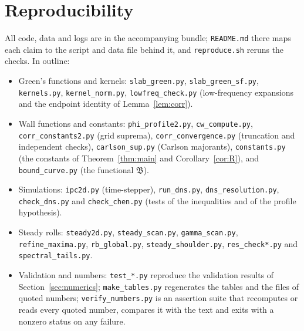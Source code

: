 \section{Reproducibility}\label{app:repro}
All code, data and logs are in the accompanying bundle; \texttt{README.md} there maps each claim to the script
and data file behind it, and \texttt{reproduce.sh} reruns the checks. In outline:
\begin{itemize}\raggedright
\item Green's functions and kernels: \texttt{slab\_green.py}, \texttt{slab\_green\_sf.py}, \texttt{kernels.py},
\texttt{kernel\_norm.py}, \texttt{lowfreq\_check.py} (low-frequency expansions and the endpoint identity of
Lemma~\ref{lem:corr}).
\item Wall functions and constants: \texttt{phi\_profile2.py}, \texttt{cw\_compute.py}, \texttt{corr\_constants2.py}
(grid suprema), \texttt{corr\_convergence.py} (truncation and independent checks), \texttt{carlson\_sup.py}
(Carlson majorants), \texttt{constants.py} (the constants of Theorem~\ref{thm:main} and Corollary~\ref{cor:R}), and
\texttt{bound\_curve.py} (the functional $\mathfrak B$).
\item Simulations: \texttt{ipc2d.py} (time-stepper), \texttt{run\_dns.py}, \texttt{dns\_resolution.py},
\texttt{check\_dns.py} and \texttt{check\_chen.py} (tests of the inequalities and of the profile hypothesis).
\item Steady rolls: \texttt{steady2d.py}, \texttt{steady\_scan.py}, \texttt{gamma\_scan.py},
\texttt{refine\_maxima.py}, \texttt{rb\_global.py}, \texttt{steady\_shoulder.py}, \texttt{res\_check*.py} and
\texttt{spectral\_tails.py}.
\item Validation and numbers: \texttt{test\_*.py} reproduce the validation results of Section~\ref{sec:numerics};
\texttt{make\_tables.py} regenerates the tables and the files of quoted numbers; \texttt{verify\_numbers.py} is an
assertion suite that recomputes or reads every quoted number, compares it with the text and exits with a nonzero
status on any failure.
\end{itemize}
